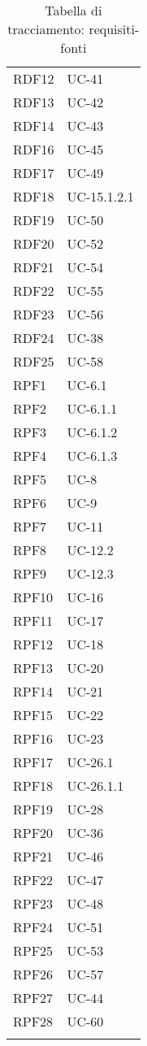 \begin{longtable}{| p{5cm} | p{5cm} |}
		RDF12 & UC-41\\
		RDF13 & UC-42\\
		\rowcolor{LightGray}
		RDF14 & UC-43\\
		RDF16 & UC-45\\
		\rowcolor{LightGray}
		RDF17 & UC-49 \\
		RDF18 & UC-15.1.2.1 \\
		\rowcolor{LightGray}
		RDF19 & UC-50 \\
		RDF20 & UC-52 \\
		\rowcolor{LightGray}
		RDF21 & UC-54 \\
		RDF22 & UC-55 \\
		\rowcolor{LightGray}
		RDF23 & UC-56 \\
		RDF24 & UC-38\\
		\rowcolor{LightGray}
		RDF25 & UC-58\\
		RPF1 & UC-6.1\\
		\rowcolor{LightGray}
		RPF2 & UC-6.1.1\\
		RPF3 & UC-6.1.2\\
		\rowcolor{LightGray}
		RPF4 & UC-6.1.3\\
		RPF5 & UC-8\\
		\rowcolor{LightGray}
		RPF6 & UC-9\\
		RPF7 & UC-11\\
		\rowcolor{LightGray}
		RPF8 & UC-12.2\\
		RPF9 & UC-12.3\\
		\rowcolor{LightGray}
		RPF10 & UC-16\\
		RPF11 & UC-17\\
		\rowcolor{LightGray}
		RPF12 & UC-18\\
		RPF13 & UC-20\\
		\rowcolor{LightGray}
		RPF14 & UC-21\\
		RPF15 & UC-22\\
		\rowcolor{LightGray}
		RPF16 & UC-23\\
		RPF17 & UC-26.1\\
		\rowcolor{LightGray}
		RPF18 & UC-26.1.1\\
		RPF19 & UC-28\\
		\rowcolor{LightGray}
		RPF20 & UC-36\\
		RPF21 & UC-46\\
		\rowcolor{LightGray}
		RPF22 & UC-47\\
		RPF23 & UC-48\\
		\rowcolor{LightGray}
		RPF24 & UC-51\\
		RPF25 & UC-53\\
		\rowcolor{LightGray}
		RPF26 & UC-57\\	
		RPF27 & UC-44\\
		\rowcolor{LightGray}
		RPF28 & UC-60\\
		\hline
		\caption{Tabella di tracciamento: requisiti-fonti}
\end{longtable}

